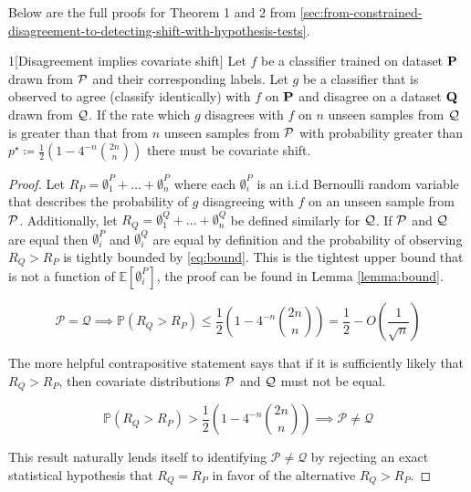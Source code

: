 Below are the full proofs for Theorem 1 and 2 from \autoref{sec:from-constrained-disagreement-to-detecting-shift-with-hypothesis-tests}.

\begin{manualtheorem}{1}[Disagreement implies covariate shift]
  Let $f$ be a classifier trained on dataset $\mathbf{P}$ drawn from $\mathcal{P}$ and their corresponding labels.
    Let $g$ be a classifier that is observed to agree (classify identically) with $f$ on $\mathbf{P}$ and disagree on a dataset $\mathbf{Q}$ drawn from $\mathcal{Q}$.
    If the rate which $g$ disagrees with $f$ on $n$ unseen samples from $\mathcal{Q}$ is greater than that from $n$ unseen samples from $\mathcal{P}$ with probability greater than $p^\star \coloneqq \frac{1}{2}\left(1- 4^{-n} \binom{2n}{n}\right)$ there must be covariate shift.
\end{manualtheorem}
\begin{proof}
    Let $R_P=\emptyset^{P}_1+ \ldots+ \emptyset^P_n$ where each $\emptyset^P_i$ is an i.i.d Bernoulli random variable that describes the probability of $g$ disagreeing with $f$ on an unseen sample from $\mathcal{P}$.
    Additionally, let $R_Q=\emptyset^Q_1+ \ldots+ \emptyset^Q_n$ be defined similarly for $\mathcal{Q}$.
    If $\mathcal{P}$ and $\mathcal{Q}$ are equal then $\emptyset^P_i$ and $\emptyset^Q_i$ are equal by definition and the probability of observing $R_Q >R_P$ is tightly bounded by \autoref{eq:bound}.
    This is the tightest upper bound that is not a function of $\mathbb{E}[\emptyset^P_i]$, the proof can be found in Lemma \autoref{lemma:bound}.

    \begin{equation}
        \mathcal{P=Q} \implies \mathbb{P}\left(R_Q > R_P \right) \leq \frac{1}{2} \left(1-4^{-n} \binom{2 n}{n}\right) = \frac{1}{2} - O\left(\frac{1}{\sqrt{n}}\right)
        \label{eq:bound}
    \end{equation}


    The more helpful contrapositive statement says that if it is sufficiently likely that $R_Q>R_P$, then covariate distributions $\mathcal{P}$ and $\mathcal{Q}$ must not be equal.

    \begin{equation}
        \mathbb{P}\left(R_Q > R_P \right) > \frac{1}{2} \left(1-4^{-n} \binom{2 n}{n}\right) \implies \mathcal{P\neq Q}
        \label{eq:th1result}
    \end{equation}

    This result naturally lends itself to identifying $\mathcal{P\neq Q}$ by rejecting an exact statistical hypothesis that $R_Q=R_P$ in favor of the alternative $R_Q>R_P$.
\end{proof}

